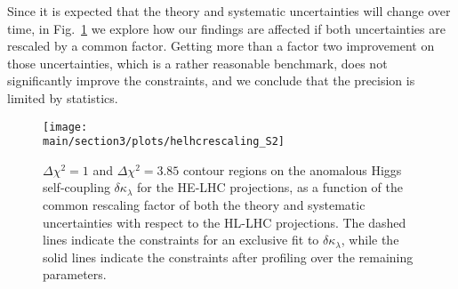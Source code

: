 Since it is expected that the theory and systematic uncertainties will change over time, in Fig.~\ref{fig:helhcrescaling} we explore how our findings are affected if both uncertainties are rescaled by a common factor. Getting more than a factor two improvement on those uncertainties, which is a rather reasonable benchmark, does not significantly improve the constraints, and we conclude that the precision is limited by statistics.	

\begin{figure}[h]
	\centering
	\texttt{[image: \\main/section3/plots/helhcrescaling\_S2]}
	\caption{$\Delta\chi^2=1$ and $\Delta\chi^2=3.85$ contour regions on the anomalous Higgs self-coupling $\delta \kappa_\lambda$ for the HE-LHC projections, as a function of the common rescaling factor of both the theory and systematic uncertainties with respect to the HL-LHC projections. The dashed lines indicate the constraints for an exclusive fit to $\delta\kappa_\lambda$, while the solid lines indicate the constraints after profiling over the remaining parameters.}
	\label{fig:helhcrescaling}
\end{figure}
